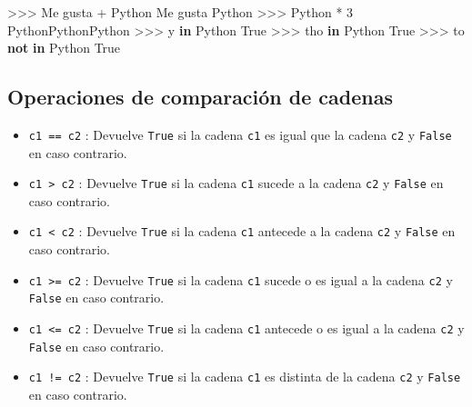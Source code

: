 \documentclass[
  spanish,
  a4paper,
]{scrreport}
\newenvironment{Shaded}{\begin{snugshade}}{\end{snugshade}}
\newcommand{\CommentTok}[1]{\textcolor[rgb]{0.37,0.37,0.37}{#1}}
\newcommand{\DecValTok}[1]{\textcolor[rgb]{0.68,0.00,0.00}{#1}}
\newcommand{\KeywordTok}[1]{\textcolor[rgb]{0.00,0.23,0.31}{\textbf{#1}}}
\newcommand{\OperatorTok}[1]{\textcolor[rgb]{0.37,0.37,0.37}{#1}}
\newcommand{\StringTok}[1]{\textcolor[rgb]{0.13,0.47,0.30}{#1}}
\newcommand{\VariableTok}[1]{\textcolor[rgb]{0.07,0.07,0.07}{#1}}
\providecommand{\tightlist}{%
  \setlength{\itemsep}{0pt}\setlength{\parskip}{0pt}}
\begin{document}
\begin{Shaded}
\begin{Highlighting}[]
\OperatorTok{\textgreater{}\textgreater{}\textgreater{}} \StringTok{\textquotesingle{}Me gusta \textquotesingle{}} \OperatorTok{+} \StringTok{\textquotesingle{}Python\textquotesingle{}}
\CommentTok{\textquotesingle{}Me gusta Python\textquotesingle{}}
\OperatorTok{\textgreater{}\textgreater{}\textgreater{}} \StringTok{\textquotesingle{}Python\textquotesingle{}} \OperatorTok{*} \DecValTok{3}
\CommentTok{\textquotesingle{}PythonPythonPython\textquotesingle{}}
\OperatorTok{\textgreater{}\textgreater{}\textgreater{}} \StringTok{\textquotesingle{}y\textquotesingle{}} \KeywordTok{in} \StringTok{\textquotesingle{}Python\textquotesingle{}}
\VariableTok{True}
\OperatorTok{\textgreater{}\textgreater{}\textgreater{}} \StringTok{\textquotesingle{}tho\textquotesingle{}} \KeywordTok{in} \StringTok{\textquotesingle{}Python\textquotesingle{}}
\VariableTok{True}
\OperatorTok{\textgreater{}\textgreater{}\textgreater{}} \StringTok{\textquotesingle{}to\textquotesingle{}} \KeywordTok{not} \KeywordTok{in} \StringTok{\textquotesingle{}Python\textquotesingle{}}
\VariableTok{True}
\end{Highlighting}
\end{Shaded}

\subsection{Operaciones de comparación de
cadenas}\label{operaciones-de-comparaciuxf3n-de-cadenas}

\begin{itemize}
\tightlist
\item
  \texttt{c1\ ==\ c2} : Devuelve \texttt{True} si la cadena \texttt{c1}
  es igual que la cadena \texttt{c2} y \texttt{False} en caso contrario.
\item
  \texttt{c1\ \textgreater{}\ c2} : Devuelve \texttt{True} si la cadena
  \texttt{c1} sucede a la cadena \texttt{c2} y \texttt{False} en caso
  contrario.
\item
  \texttt{c1\ \textless{}\ c2} : Devuelve \texttt{True} si la cadena
  \texttt{c1} antecede a la cadena \texttt{c2} y \texttt{False} en caso
  contrario.
\item
  \texttt{c1\ \textgreater{}=\ c2} : Devuelve \texttt{True} si la cadena
  \texttt{c1} sucede o es igual a la cadena \texttt{c2} y \texttt{False}
  en caso contrario.
\item
  \texttt{c1\ \textless{}=\ c2} : Devuelve \texttt{True} si la cadena
  \texttt{c1} antecede o es igual a la cadena \texttt{c2} y
  \texttt{False} en caso contrario.
\item
  \texttt{c1\ !=\ c2} : Devuelve \texttt{True} si la cadena \texttt{c1}
  es distinta de la cadena \texttt{c2} y \texttt{False} en caso
  contrario.
\end{itemize}
\end{document}
